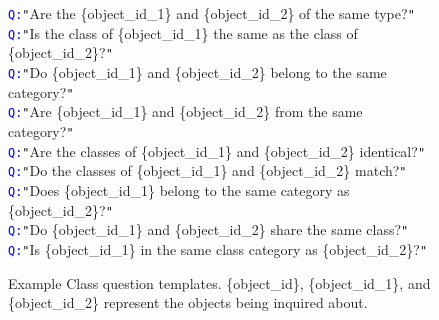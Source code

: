 \begin{figure*}[htbp]
\begin{tcolorbox}[colback=gray!10,%
	colframe=black,%
	width=\textwidth,
	arc=1mm, auto outer arc,
	boxrule=0.5pt,
	]
	\texttt{\textcolor{blue}{Q:}}\texttt{"}Are the \mbox{\{object\_id\_1\}} and \mbox{\{object\_id\_2\}} of the same type?\texttt{"}\\
        \texttt{\textcolor{blue}{Q:}}\texttt{"}Is the class of \mbox{\{object\_id\_1\}} the same as the class of \mbox{\{object\_id\_2\}}?\texttt{"}\\
        \texttt{\textcolor{blue}{Q:}}\texttt{"}Do \mbox{\{object\_id\_1\}} and \mbox{\{object\_id\_2\}} belong to the same category?\texttt{"}\\
        \texttt{\textcolor{blue}{Q:}}\texttt{"}Are \mbox{\{object\_id\_1\}} and \mbox{\{object\_id\_2\}} from the same category?\texttt{"}\\
        \texttt{\textcolor{blue}{Q:}}\texttt{"}Are the classes of \mbox{\{object\_id\_1\}} and \mbox{\{object\_id\_2\}} identical?\texttt{"}\\
        \texttt{\textcolor{blue}{Q:}}\texttt{"}Do the classes of \mbox{\{object\_id\_1\}} and \mbox{\{object\_id\_2\}} match?\texttt{"}\\
        \texttt{\textcolor{blue}{Q:}}\texttt{"}Does \mbox{\{object\_id\_1\}} belong to the same category as \mbox{\{object\_id\_2\}}?\texttt{"}\\
        \texttt{\textcolor{blue}{Q:}}\texttt{"}Do \mbox{\{object\_id\_1\}} and \mbox{\{object\_id\_2\}} share the same class?\texttt{"}\\
        \texttt{\textcolor{blue}{Q:}}\texttt{"}Is \mbox{\{object\_id\_1\}} in the same class category as \mbox{\{object\_id\_2\}}?\texttt{"}\\

\end{tcolorbox}
\caption{Example Class question templates. \mbox{\{object\_id\}}, \mbox{\{object\_id\_1\}}, and \mbox{\{object\_id\_2\}} represent the objects being inquired about.}
\label{fig:class_qa_templates}
\end{figure*}


